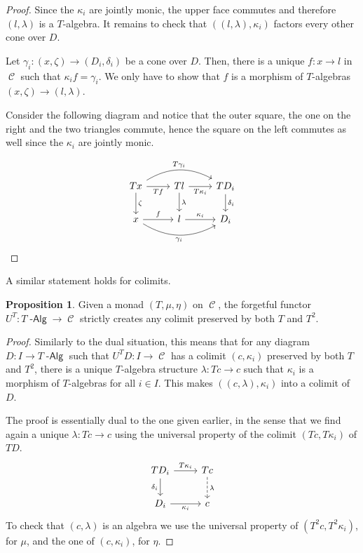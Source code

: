 \documentclass[a4paper,11pt,oneside,openany]{scrbook}
\DeclareMathOperator{\Alg}{-\mathsf{Alg}}
\DeclareMathOperator{\C}{\mathcal{C}}
\theoremstyle{definition}
\theoremstyle{definition}
\newtheorem{prop}[thm]{Proposition}
\begin{document}
\begin{proof}
	Since the $\kappa_i$ are jointly monic, the upper face commutes and therefore $(l,\lambda)$ is a $T$-algebra. It remains to check that $((l,\lambda),\kappa_i)$ factors every other cone over $D$.
	
	Let $\gamma_i\colon(x,\zeta)\rightarrow (D_i,\delta_i)$ be a cone over $D$. Then, there is a unique $f\colon x\rightarrow l$ in $\C$ such that $\kappa_if=\gamma_i$. We only have to show that $f$ is a morphism of $T$-algebras $(x,\zeta)\rightarrow (l,\lambda)$.
	
	Consider the following diagram and notice that the outer square, the one on the right and the two triangles commute, hence the square on the left commutes as well since the $\kappa_i$ are jointly monic.
	
	\[
		\begin{tikzcd}
			Tx\ar[rr, bend left, "T\gamma_i"]\ar[r, swap, "Tf"]\ar[d, "\zeta"]
			& Tl\ar[r, swap, "T\kappa_i"]\ar[d, "\lambda"]
			& TD_i\ar[d, "\delta_i"] \\
			x\ar[r, "f"]\ar[rr, bend right, swap, "\gamma_i"]
			& l\ar[r, "\kappa_i"]
			& D_i
		\end{tikzcd}
	\]
\end{proof}

A similar statement holds for colimits.

\begin{prop}\label{create colims}
Given a monad $(T,\mu,\eta)$ on $\C$, the forgetful functor $U^T\colon T\Alg\rightarrow\C$ strictly creates any colimit preserved by both $T$ and $T^2$.
\end{prop}

\begin{proof}
	Similarly to the dual situation, this means that for any diagram $D\colon I\rightarrow T\Alg$ such that $U^TD\colon I\rightarrow\C$ has a colimit $(c,\kappa_i)$ preserved by both $T$ and $T^2$, there is a unique $T$-algebra structure $\lambda\colon Tc\rightarrow c$ such that $\kappa_i$ is a morphism of $T$-algebras for all $i\in I$. This makes $((c,\lambda),\kappa_i)$ into a colimit of $D$.
	
	The proof is essentially dual to the one given earlier, in the sense that we find again a unique $\lambda\colon Tc\rightarrow c$ using the universal property of the colimit $(Tc,T\kappa_i)$ of $TD$.
	\[
		\begin{tikzcd}
			TD_i\ar[r, "T\kappa_i"]\ar[d, "\delta_i"']
			& Tc\ar[d, dashed, "\lambda"] \\
			D_i\ar[r, "\kappa_i"']
			& c
		\end{tikzcd}
	\]
	To check that $(c,\lambda)$ is an algebra we use the universal property of $(T^2c,T^2\kappa_i)$, for $\mu$, and the one of $(c,\kappa_i)$, for $\eta$.
\end{proof}
\end{document}
